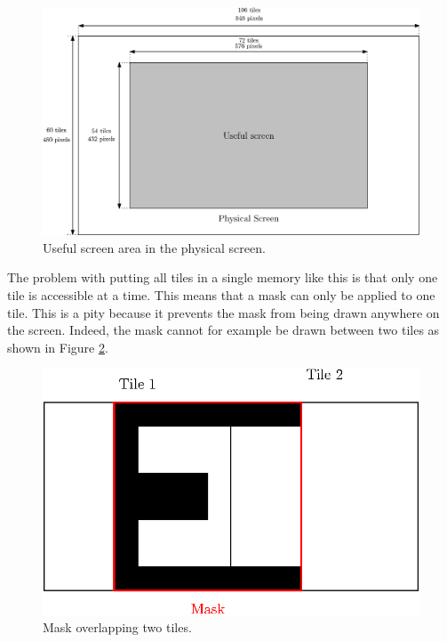 \begin{figure}[H]
    \centering
    \includegraphics[width=\linewidth]{Chapter4-GPU_CLKU/res/screen_size}
    \caption{Useful screen area in the physical screen.}
    \label{fig:gpu/screen_size}
\end{figure}

The problem with putting all tiles in a single memory like this is that only one tile is accessible 
at a time. This means that a mask can only be applied to one tile. This is a pity because it 
prevents the mask from being drawn anywhere on the screen. Indeed, the mask cannot for example be 
drawn between two tiles as shown in Figure \ref{fig:gpu/mask_2tiles}.

\begin{figure}[H]
    \centering
    \includegraphics[scale=1.0]{Chapter4-GPU_CLKU/res/mask_2tiles}
    \caption{Mask overlapping two tiles.}
    \label{fig:gpu/mask_2tiles}
\end{figure}

